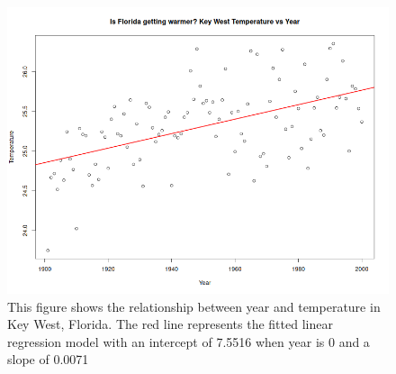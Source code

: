 \documentclass{article}
\begin{document}
\centering
\begin{figure}[H]
    \centering
    \includegraphics[width=0.9\linewidth]{../data/KeyWest_Temperature_vs_Year.png}
    \vspace{2em}
    \caption[Key West Temperature vs Year]{This figure shows the relationship between year and temperature in Key West, Florida. The red line represents the fitted linear regression model with an intercept of 7.5516 when year is 0 and a slope of 0.0071}
    \label{fig:label2}
\end{figure}
\end{document}
